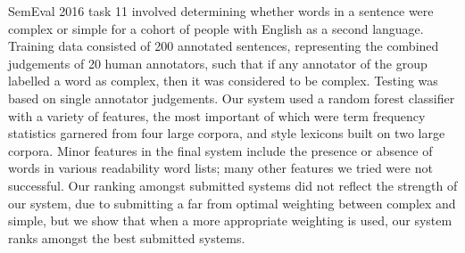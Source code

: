 SemEval 2016 task 11 involved determining whether words in a sentence were complex or simple for a cohort of people with English as a second language.  Training data consisted of 200 annotated sentences, representing the combined judgements of 20 human annotators, such that if any annotator of the group labelled a word as complex, then it was considered to be complex.  Testing was based on single annotator judgements. Our system used a random forest classifier with a variety of features, the most important of which were term frequency statistics garnered from four large corpora, and style lexicons built on two large corpora.              Minor features in the final system include the presence or absence of words in various readability word lists; many other features we tried were not successful. Our ranking amongst submitted systems did not reflect the strength of our system, due to submitting a far from optimal weighting between complex and simple, but we show that when a more appropriate weighting is used, our system ranks amongst the best submitted systems.

